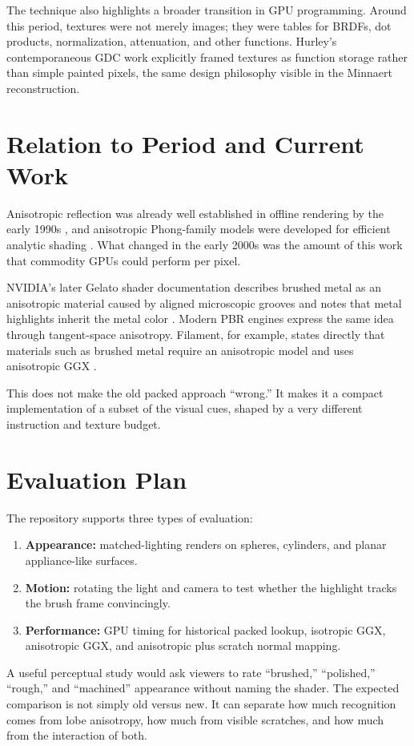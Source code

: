 \documentclass[10pt]{article}
\begin{document}
The technique also highlights a broader transition in GPU programming. Around this period, textures were not merely images; they were tables for BRDFs, dot products, normalization, attenuation, and other functions. Hurley's contemporaneous GDC work explicitly framed textures as function storage rather than simple painted pixels, the same design philosophy visible in the Minnaert reconstruction.

\section{Relation to Period and Current Work}
Anisotropic reflection was already well established in offline rendering by the early 1990s \cite{ward1992}, and anisotropic Phong-family models were developed for efficient analytic shading \cite{ashikhmin2000}. What changed in the early 2000s was the amount of this work that commodity GPUs could perform per pixel.

NVIDIA's later Gelato shader documentation describes brushed metal as an anisotropic material caused by aligned microscopic grooves and notes that metal highlights inherit the metal color \cite{gelato2005}. Modern PBR engines express the same idea through tangent-space anisotropy. Filament, for example, states directly that materials such as brushed metal require an anisotropic model and uses anisotropic GGX \cite{filament}.

This does not make the old packed approach ``wrong.'' It makes it a compact implementation of a subset of the visual cues, shaped by a very different instruction and texture budget.

\section{Evaluation Plan}
The repository supports three types of evaluation:
\begin{enumerate}
\item \textbf{Appearance:} matched-lighting renders on spheres, cylinders, and planar appliance-like surfaces.
\item \textbf{Motion:} rotating the light and camera to test whether the highlight tracks the brush frame convincingly.
\item \textbf{Performance:} GPU timing for historical packed lookup, isotropic GGX, anisotropic GGX, and anisotropic plus scratch normal mapping.
\end{enumerate}

A useful perceptual study would ask viewers to rate ``brushed,'' ``polished,'' ``rough,'' and ``machined'' appearance without naming the shader. The expected comparison is not simply old versus new. It can separate how much recognition comes from lobe anisotropy, how much from visible scratches, and how much from the interaction of both.
\end{document}

